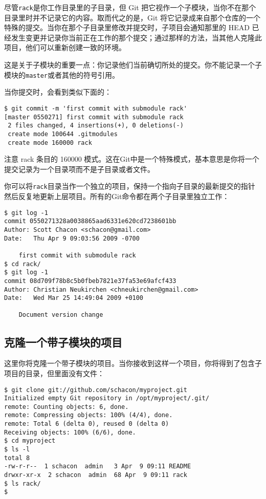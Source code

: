 \documentclass[a4paper]{book}
\begin{document}
尽管\texttt{rack}是你工作目录里的子目录，但 Git 把它视作一个子模块，当你不在那个目录里时并不记录它的内容。取而代之的是，Git 将它记录成来自那个仓库的一个特殊的提交。当你在那个子目录里修改并提交时，子项目会通知那里的 HEAD 已经发生变更并记录你当前正在工作的那个提交；通过那样的方法，当其他人克隆此项目，他们可以重新创建一致的环境。

这是关于子模块的重要一点：你记录他们当前确切所处的提交。你不能记录一个子模块的\texttt{master}或者其他的符号引用。

当你提交时，会看到类似下面的：

\begin{shaded}\begin{verbatim}
$ git commit -m 'first commit with submodule rack'
[master 0550271] first commit with submodule rack
 2 files changed, 4 insertions(+), 0 deletions(-)
 create mode 100644 .gitmodules
 create mode 160000 rack
\end{verbatim}\end{shaded}

注意 rack 条目的 160000 模式。这在Git中是一个特殊模式，基本意思是你将一个提交记录为一个目录项而不是子目录或者文件。

你可以将\texttt{rack}目录当作一个独立的项目，保持一个指向子目录的最新提交的指针然后反复地更新上层项目。所有的Git命令都在两个子目录里独立工作：

\begin{shaded}\begin{verbatim}
$ git log -1
commit 0550271328a0038865aad6331e620cd7238601bb
Author: Scott Chacon <schacon@gmail.com>
Date:   Thu Apr 9 09:03:56 2009 -0700

    first commit with submodule rack
$ cd rack/
$ git log -1
commit 08d709f78b8c5b0fbeb7821e37fa53e69afcf433
Author: Christian Neukirchen <chneukirchen@gmail.com>
Date:   Wed Mar 25 14:49:04 2009 +0100

    Document version change
\end{verbatim}\end{shaded}

\subsection{克隆一个带子模块的项目}

这里你将克隆一个带子模块的项目。当你接收到这样一个项目，你将得到了包含子项目的目录，但里面没有文件：

\begin{shaded}\begin{verbatim}
$ git clone git://github.com/schacon/myproject.git
Initialized empty Git repository in /opt/myproject/.git/
remote: Counting objects: 6, done.
remote: Compressing objects: 100% (4/4), done.
remote: Total 6 (delta 0), reused 0 (delta 0)
Receiving objects: 100% (6/6), done.
$ cd myproject
$ ls -l
total 8
-rw-r-r--  1 schacon  admin   3 Apr  9 09:11 README
drwxr-xr-x  2 schacon  admin  68 Apr  9 09:11 rack
$ ls rack/
$
\end{verbatim}\end{shaded}
\end{document}
